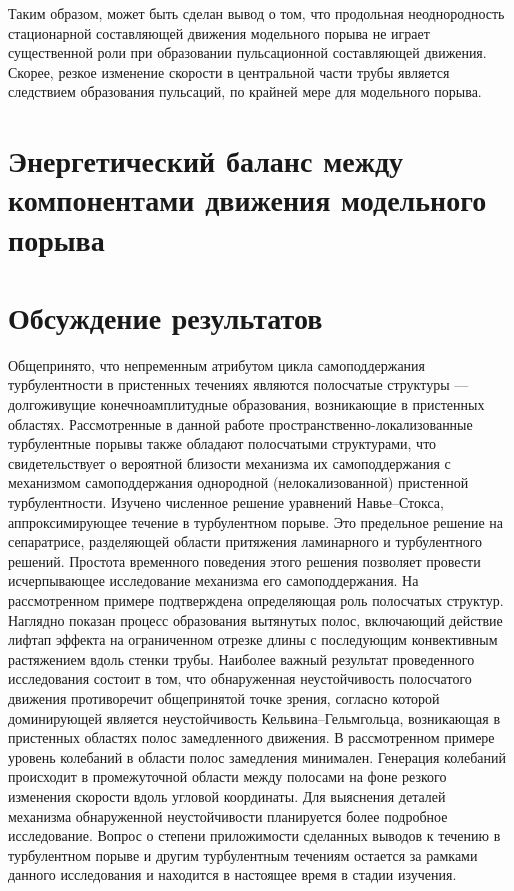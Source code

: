 Таким образом, может быть сделан вывод о том, что продольная неоднородность стационарной составляющей движения модельного порыва не играет существенной роли при образовании пульсационной составляющей движения. Скорее, резкое изменение скорости в центральной части трубы является следствием образования пульсаций, по крайней мере для модельного порыва. 

\section{Энергетический баланс между компонентами движения модельного порыва}



\section{Обсуждение результатов}

Общепринято, что непременным атрибутом цикла самоподдержания турбулентности в пристенных течениях являются полосчатые структуры --- долгоживущие конечноамплитудные образования, возникающие в пристенных областях. Рассмотренные в данной работе пространственно-локализованные турбулентные порывы также обладают полосчатыми структурами, что свидетельствует о вероятной близости механизма их самоподдержания с механизмом самоподдержания однородной (нелокализованной) пристенной турбулентности. Изучено численное решение уравнений Навье--Стокса, аппроксимирующее течение в турбулентном порыве. Это предельное решение на сепаратрисе, разделяющей области притяжения ламинарного и турбулентного решений. Простота временного поведения этого решения позволяет провести исчерпывающее исследование механизма его самоподдержания. На рассмотренном примере подтверждена определяющая роль полосчатых структур. Наглядно показан процесс образования вытянутых полос, включающий действие лифтап  эффекта на ограниченном отрезке длины с последующим конвективным растяжением вдоль стенки трубы. Наиболее важный результат проведенного исследования состоит в том, что обнаруженная неустойчивость полосчатого движения противоречит общепринятой точке зрения, согласно которой доминирующей является неустойчивость Кельвина--Гельмгольца, возникающая в пристенных областях полос замедленного движения. В рассмотренном примере уровень колебаний в области полос замедления минимален. Генерация колебаний происходит в промежуточной области между полосами на фоне резкого изменения скорости вдоль угловой координаты. Для выяснения деталей механизма обнаруженной неустойчивости планируется более подробное исследование. Вопрос о степени приложимости сделанных выводов к течению в турбулентном порыве и другим турбулентным течениям остается за рамками данного исследования и находится в настоящее время в стадии изучения.


